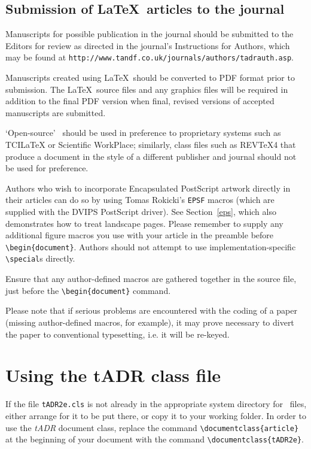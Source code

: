 \documentclass{tADR2e}
\begin{document}
\subsection{Submission of \LaTeX\ articles to the journal}\label{S1.2}

Manuscripts for possible publication in the journal should be submitted to the Editors for review as directed in the journal's Instructions for Authors, which may be found at {\tt{http://www.tandf.co.uk/journals/authors/tadrauth.asp}}.

Manuscripts created using \LaTeX\ should be converted to PDF format prior to submission. The \LaTeX\ source files and any graphics files will be required in addition to the final PDF version when final, revised versions of accepted manuscripts are submitted.

`Open-source' \LaTeXe\ should be used in preference to proprietary systems such as TCILaTeX or Scientific WorkPlace; similarly, class files such as REVTeX4 that produce a document in the style of a different publisher and journal should not be used for preference.

Authors who wish to incorporate Encapsulated PostScript artwork directly in their articles can do so by using
Tomas Rokicki's {\tt EPSF} macros (which are supplied with the DVIPS PostScript driver). See Section~\ref{eps},
which also demonstrates how to treat landscape pages. Please remember to supply any additional figure macros you
use with your article in the preamble before \verb"\begin{document}". Authors should not attempt to use
implementation-specific \verb"\special"s directly.

Ensure that any author-defined macros are gathered together in the source file, just before the
\verb"\begin{document}" command.

Please note that if serious problems are encountered with the coding of a paper (missing author-defined macros,
for example), it may prove necessary to divert the paper to conventional typesetting, i.e. it will be re-keyed.


\section{Using the {\bi tADR} class file}

If the file {\tt tADR2e.cls} is not already in the appropriate system directory for \LaTeXe\ files, either
arrange for it to be put there, or copy it to your working folder. In order to use the {\it tADR} document class, replace the command
\verb"\documentclass{article}" at the beginning of your document with the command \verb"\documentclass{tADR2e}".
\end{document}
